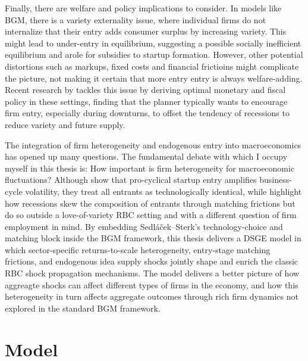 \documentclass[a4paper,12pt]{article} %
\numberwithin{equation}{section} %
\numberwithin{figure}{section}
\numberwithin{table}{section}
\begin{document}
Finally, there are welfare and policy implications to consider. In models like BGM, there is a variety externality issue, where individual firms do not internalize
that their entry adds consumer surplus by increasing variety. This might lead to under-entry in equilibrium, suggesting a possible socially inefficient equilibrium 
and arole for subsidies to startup formation. However, other potential distortions such as markups, fixed costs and financial frictioins might complicate the picture, 
not making it certain that more entry entry is always welfare-adding. Recent research by \textcite{bilbiie2019monopoly} tackles this issue by deriving optimal monetary
and fiscal policy in these settings, finding that the planner typically wants to encourage firm entry, especially during downturns, to offset the tendency of recessions
to reduce variety and future supply.

The integration of firm heterogeneity and endogenous entry into macroeconomics has opened up many questions. The fundamental debate with which I occupy myself
in this thesis is: How important is firm heterogeneity for macroeconomic fluctuations? Although \textcite{bilbiie2012endogenous} show that 
pro-cyclical startup entry amplifies business-cycle volatility, they treat all entrants as technologically identical, while \textcite{sedlavcek2017growth} 
highlight how recessions skew the composition of entrants through matching frictions but do so outside a love-of-variety RBC setting and with a different question of
firm employment in mind. By embedding Sedláček–Sterk’s technology-choice and matching block inside the BGM framework, 
this thesis delivers a DSGE model in which sector-specific returns-to-scale heterogeneity, entry-stage matching frictions, and endogenous idea supply shocks jointly shape 
and enrich the classic RBC shock propagation mechanisms. The model delivers a better picture of how aggreagte shocks can affect different types of firms in the economy, and
how this heterogeneity in turn affects aggregate outcomes through rich firm dynamics not explored in the standard BGM framework.


\section{Model}
\label{sec:model}
\end{document}

